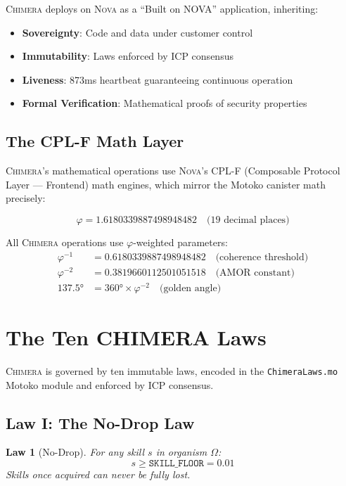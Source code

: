 \documentclass[12pt]{article}
\newtheorem{law}{Law}
\newcommand{\PHI}{\varphi}
\newcommand{\CHIMERA}{\textsc{Chimera}}
\newcommand{\NOVA}{\textsc{Nova}}
\begin{document}
\CHIMERA{} deploys on \NOVA{} as a ``Built on NOVA'' application, inheriting:
\begin{itemize}[nosep]
  \item \textbf{Sovereignty}: Code and data under customer control
  \item \textbf{Immutability}: Laws enforced by ICP consensus
  \item \textbf{Liveness}: 873ms heartbeat guaranteeing continuous operation
  \item \textbf{Formal Verification}: Mathematical proofs of security properties
\end{itemize}

\subsection{The CPL-F Math Layer}

\CHIMERA{}'s mathematical operations use \NOVA{}'s CPL-F (Composable Protocol Layer — Frontend) math engines, which mirror the Motoko canister math precisely:

\begin{equation}
\PHI = 1.6180339887498948482 \quad \text{(19 decimal places)}
\end{equation}

All \CHIMERA{} operations use $\PHI$-weighted parameters:
\begin{align}
  \PHI^{-1} &= 0.6180339887498948482 \quad \text{(coherence threshold)} \\
  \PHI^{-2} &= 0.3819660112501051518 \quad \text{(AMOR constant)} \\
  137.5° &= 360° \times \PHI^{-2} \quad \text{(golden angle)}
\end{align}

\section{The Ten CHIMERA Laws}
\label{sec:laws}

\CHIMERA{} is governed by ten immutable laws, encoded in the \texttt{ChimeraLaws.mo} Motoko module and enforced by ICP consensus.

\subsection{Law I: The No-Drop Law}

\begin{law}[No-Drop]
For any skill $s$ in organism $\Omega$:
\begin{equation}
  s \geq \texttt{SKILL\_FLOOR} = 0.01
\end{equation}
Skills once acquired can never be fully lost.
\end{law}
\end{document}
